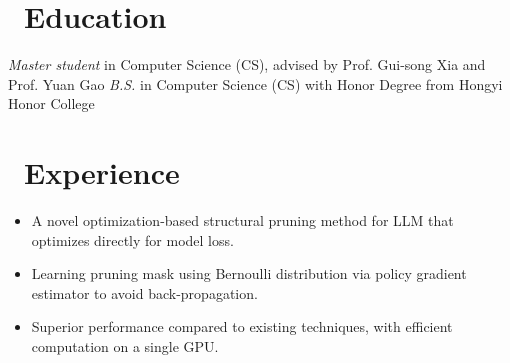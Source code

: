 \documentclass{resume}
\begin{document}
\section{\faGraduationCap\ Education}
\textit{Master student} in Computer Science (CS), advised by Prof. Gui-song Xia and Prof. Yuan Gao
\textit{B.S.} in Computer Science (CS) with Honor Degree from Hongyi Honor College

\section{\faUsers\ Experience}
\begin{itemize}
  \item A novel optimization-based structural pruning method for LLM that optimizes directly for model loss.
  \item Learning pruning mask using Bernoulli distribution via policy gradient estimator to avoid back-propagation.
  \item Superior performance compared to existing techniques, with efficient computation on a single GPU.
\end{itemize}


\end{document}
